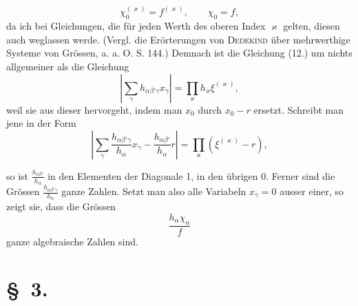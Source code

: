 \documentclass[11pt]{article}
\begin{document}
\begin{equation*}\tag{13.}
\chi_0^{(\varkappa)}=f^{(\varkappa)},\qquad \chi_0=f,
\end{equation*}
da ich bei Gleichungen, die für jeden Werth des oberen Index $\varkappa$ gelten, diesen auch weglassen werde. (Vergl. die Erörterungen von \textsc{Dedekind} über mehrwerthige Systeme von Grössen, a. a. O. S. 144.) Demnach ist die Gleichung (12.) um nichts allgemeiner als die Gleichung
\begin{equation*}\tag{14.}
\left|\sum_\gamma h_{\alpha\beta'\gamma}x_\gamma\right|=\prod_\varkappa h_\varkappa\xi^{(\varkappa)},
\end{equation*}
weil sie aus dieser hervorgeht, indem man $x_0$ durch $x_0-r$ ersetzt. Schreibt man jene in der Form
\[
\left|\sum_\gamma \frac{h_{\alpha\beta'\gamma}}{h_\alpha}x_\gamma-\frac{h_{\alpha\beta'}}{h_\alpha}r\right|=\prod_\varkappa(\xi^{(\varkappa)}-r),
\]


so ist $\frac{h_{\alpha\beta'}}{h_\alpha}$ in den Elementen der Diagonale 1, in den übrigen 0. Ferner sind die Grössen $\frac{h_{\alpha\beta'\gamma}}{h_\alpha}$ ganze Zahlen. Setzt man also alle Variabeln $x_\gamma=0$ ausser einer, so zeigt sie, dass die Grössen
\begin{equation*}\tag{15.}
\frac{h_\alpha\chi_\alpha}{f}
\end{equation*}
ganze algebraische Zahlen sind.

\section*{\S~3.}
\end{document}
